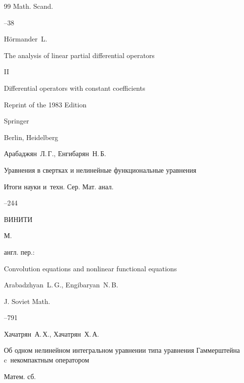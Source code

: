 \begin{thebibliography}{99}
\jour Math. Scand.


--38




\by  H\"ormander~L.

\book The analysis of linear partial differential operators

\bookvol II

\volinfo Differential operators with constant coefficients

\edition Reprint of the 1983 Edition


\publ Springer

\publaddr Berlin, Heidelberg






\by Арабаджян~Л.\,Г., Енгибарян~Н.\,Б.

\paper Уравнения в свертках и нелинейные функциональные уравнения

\serial Итоги науки и~техн. Сер. Мат. анал.



--244

\publ ВИНИТИ

\publaddr М.

\transl

англ. пер.:~

\paper Convolution equations and nonlinear functional equations

\by Arabadzhyan~L.\,G.,  Engibaryan~N.\,B.

\jour J. Soviet Math.




--791






\by Хачатрян~А.\,Х., Хачатрян~Х.\,А.

\paper Об одном нелинейном интегральном уравнении типа уравнения Гаммерштейна c~некомпактным оператором

\jour Матем. сб.



\end{thebibliography}
